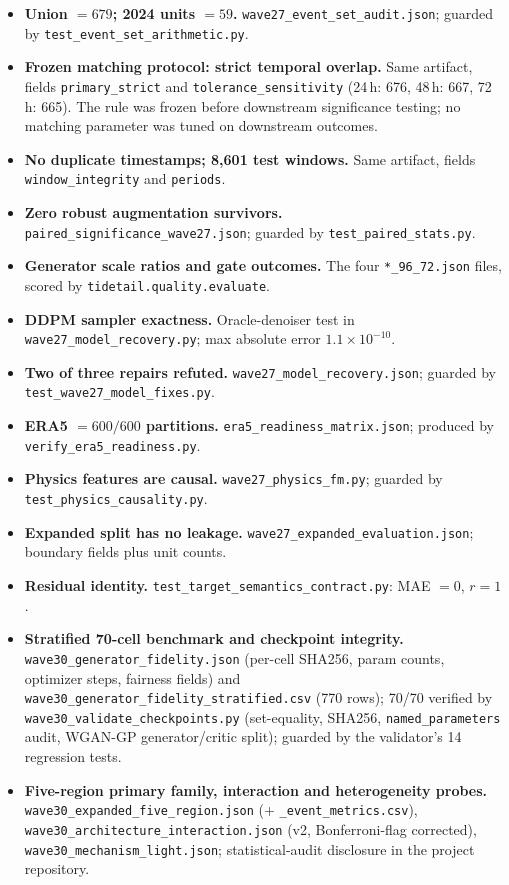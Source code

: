 \begin{itemize}
  \item \textbf{Union $=679$; 2024 units $=59$.}
  \texttt{wave27\_event\_set\_audit.json}; guarded by
  \texttt{test\_event\_set\_arithmetic.py}.
  \item \textbf{Frozen matching protocol: strict temporal overlap.}
  Same artifact, fields \texttt{primary\_strict} and
  \texttt{tolerance\_sensitivity} (24\,h: 676, 48\,h: 667, 72\,h: 665).
  The rule was frozen before downstream significance testing; no
  matching parameter was tuned on downstream outcomes.
  \item \textbf{No duplicate timestamps; 8,601 test windows.} Same artifact,
  fields \texttt{window\_integrity} and \texttt{periods}.
  \item \textbf{Zero robust augmentation survivors.}
  \texttt{paired\_significance\_wave27.json}; guarded by
  \texttt{test\_paired\_stats.py}.
  \item \textbf{Generator scale ratios and gate outcomes.} The four
  \texttt{*\_96\_72.json} files, scored by \texttt{tidetail.quality.evaluate}.
  \item \textbf{DDPM sampler exactness.} Oracle-denoiser test in
  \texttt{wave27\_model\_recovery.py}; max absolute error $1.1\times10^{-10}$.
  \item \textbf{Two of three repairs refuted.} \texttt{wave27\_model\_recovery.json};
  guarded by \texttt{test\_wave27\_model\_fixes.py}.
  \item \textbf{ERA5 $=600/600$ partitions.} \texttt{era5\_readiness\_matrix.json};
  produced by \texttt{verify\_era5\_readiness.py}.
  \item \textbf{Physics features are causal.} \texttt{wave27\_physics\_fm.py};
  guarded by \texttt{test\_physics\_causality.py}.
  \item \textbf{Expanded split has no leakage.}
  \texttt{wave27\_expanded\_evaluation.json}; boundary fields plus unit counts.
  \item \textbf{Residual identity.} \texttt{test\_target\_semantics\_contract.py}:
  MAE $=0$, $r=1$.
  \item \textbf{Stratified 70-cell benchmark and checkpoint integrity.}
  \texttt{wave30\_generator\_fidelity.json} (per-cell SHA256, param counts,
  optimizer steps, fairness fields) and
  \texttt{wave30\_generator\_fidelity\_stratified.csv} (770 rows);
  70/70 verified by \texttt{wave30\_validate\_checkpoints.py}
  (set-equality, SHA256, \texttt{named\_parameters} audit, WGAN-GP
  generator/critic split); guarded by the validator's 14 regression tests.
  \item \textbf{Five-region primary family, interaction and heterogeneity
  probes.} \texttt{wave30\_expanded\_five\_region.json} (+
  \texttt{\_event\_metrics.csv}), \texttt{wave30\_architecture\_interaction.json}
  (v2, Bonferroni-flag corrected), \texttt{wave30\_mechanism\_light.json};
  statistical-audit disclosure in the project repository.
\end{itemize}


